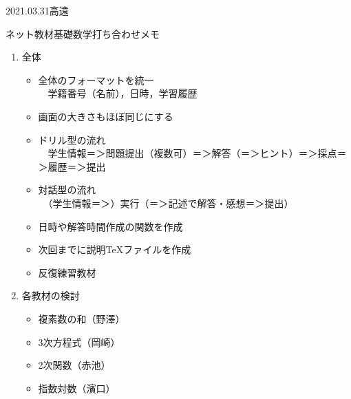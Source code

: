 \documentclass[10pt]{ujarticle}
\begin{document}
\begin{flushright}
2021.03.31高遠　　
\end{flushright}

\begin{center}
{\large ネット教材基礎数学打ち合わせメモ}
\end{center}

\begin{enumerate}[\bf 1.]
\item 全体
\begin{itemize}
\item 全体のフォーマットを統一\\
　学籍番号（名前），日時，学習履歴\\

\item 画面の大きさもほぼ同じにする\\

\item ドリル型の流れ\\
　学生情報＝＞問題提出（複数可）＝＞解答（＝＞ヒント）＝＞採点＝＞履歴＝＞提出\\
\item 対話型の流れ\\
　（学生情報＝＞）実行（＝＞記述で解答・感想＝＞提出）\\

\item 日時や解答時間作成の関数を作成\\

 \item 次回までに説明\TeX ファイルを作成\\

\item 反復練習教材\\

\end{itemize}

\item 各教材の検討
\begin{itemize}
\item[]複素数の和（野澤）\\

\item[]3次方程式（岡崎）\\

\item[]2次関数（赤池）\\

\item[]指数対数（濱口）\\


\end{itemize}
\end{enumerate}
\end{document}
